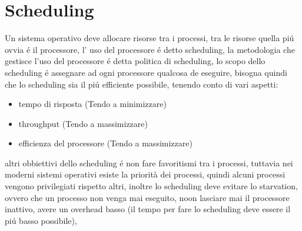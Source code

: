 \documentclass[11pt]{article}
\begin{document}
\section{Scheduling}
Un sistema operativo deve allocare risorse tra i processi, tra le risorse quella piú ovvia é il processore, l' uso del
    processore é detto scheduling, la metodologia che gestisce l'uso del processore é detta politica di scheduling,
    lo scopo dello scheduling é assegnare ad ogni processore qualcosa de eseguire, bisogna quindi che lo scheduling
    sia il piú efficiente possibile, tenendo conto di vari aspetti:
    \begin{itemize}
        \item tempo di risposta (Tendo a minimizzare)
        \item throughput (Tendo a massimizzare)
        \item efficienza del processore (Tendo a massimizzare)
    \end{itemize}
    altri obbiettivi dello scheduling é non fare favoritismi tra i processi, tuttavia nei moderni sistemi operativi
    esiste la priorità dei processi, quindi alcuni processi vengono privilegiati rispetto altri, inoltre lo scheduling
    deve evitare lo starvation, ovvero che un processo non venga mai eseguito, noon lasciare mai il processore inattivo,
    avere un overhead basso (il tempo per fare lo scheduling deve essere il piú basso possibile),
\end{document}
